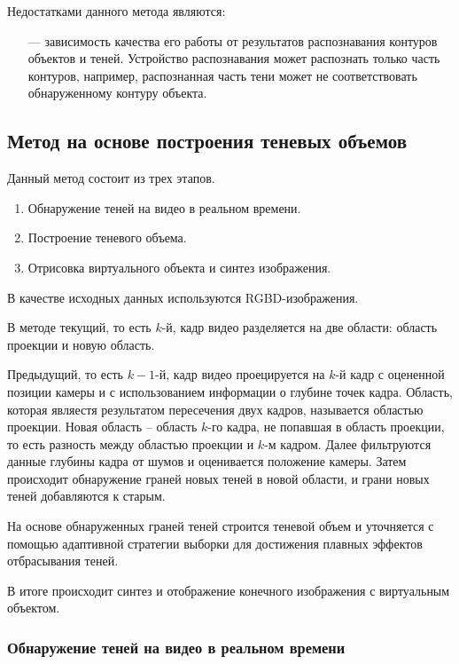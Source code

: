 Недостатками данного метода являются:

\begin{itemize}
	\item[---] зависимость качества его работы от результатов распознавания контуров объектов и теней. Устройство распознавания может распознать только часть контуров, например, распознанная часть тени может не соответствовать обнаруженному контуру объекта.
\end{itemize}

\subsection{Метод на основе построения теневых объемов}

Данный метод состоит из трех этапов.

\begin{enumerate}
	\item Обнаружение теней на видео в реальном времени.
	\item Построение теневого объема.
	\item Отрисовка виртуального объекта и синтез изображения.
\end{enumerate}

В качестве исходных данных используются RGBD-изображения.

В методе текущий, то есть $k$-й, кадр видео разделяется на две области: область проекции и новую область. 

Предыдущий, то есть $k-1$-й, кадр видео проецируется на $k$-й кадр с оцененной позиции камеры и с использованием информации о глубине точек кадра. Область, которая являестя результатом пересечения двух кадров, называется областью проекции. Новая область -- область $k$-го кадра, не попавшая в область проекции, то есть разность между областью проекции и $k$-м кадром. Далее фильтруются данные глубины кадра от шумов и оценивается положение камеры. Затем происходит обнаружение граней новых теней в новой области, и грани новых теней добавляются к старым. 

На основе обнаруженных граней теней строится теневой объем и уточняется с помощью адаптивной стратегии выборки \cite{THOMASIAN2022385} для достижения плавных эффектов отбрасывания теней.

В итоге происходит синтез и отображение конечного изображения с виртуальным объектом.

\subsubsection*{Обнаружение теней на видео в реальном времени}

